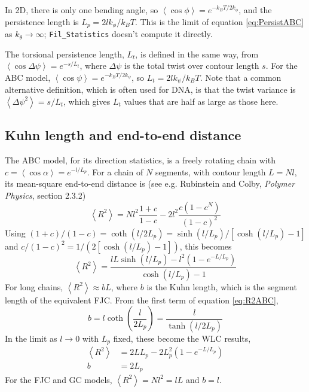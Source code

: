 \documentclass[11pt]{article}
\newcommand {\ttt} {\texttt}
\begin{document}
In 2D, there is only one bending angle, so $\left< \cos \phi \right> = e^{-k_BT/2k_\phi}$, and the persistence length is $L_p = 2 l k_\phi/k_BT$. This is the limit of equation \ref{eq:PersistABC} as $k_\theta \rightarrow \infty$; \ttt{Fil\_Statistics} doesn't compute it directly.

The torsional persistence length, $L_t$, is defined in the same way, from $\left< \cos \Delta \psi \right> = e^{-s/L_t}$, where $\Delta \psi$ is the total twist over contour length $s$. For the ABC model, $\left< \cos \psi \right> = e^{-k_BT/2k_\psi}$, so $L_t = 2 l k_\psi/k_BT$. Note that a common alternative definition, which is often used for DNA, is that the twist variance is $\left< \Delta \psi^2 \right> = s/L_t$, which gives $L_t$ values that are half as large as those here.

\subsection{Kuhn length and end-to-end distance}

The ABC model, for its direction statistics, is a freely rotating chain with $c = \left<\cos \alpha \right> = e^{-l/L_p}$. For a chain of $N$ segments, with contour length $L=Nl$, its mean-square end-to-end distance is (see e.g. Rubinstein and Colby, \textit{Polymer Physics}, section 2.3.2)
\begin{equation}
\left< R^2 \right> = N l^2 \frac{1+c}{1-c} - 2l^2 \frac{c(1-c^N)}{(1-c)^2}
\end{equation}
Using $(1+c)/(1-c) = \coth(l/2L_p) = \sinh(l/L_p)/[\cosh(l/L_p)-1]$ and $c/(1-c)^2 = 1/(2[\cosh(l/L_p)-1])$, this becomes
\begin{equation}
\left< R^2 \right> = \frac{l L \sinh(l/L_p) - l^2 \left(1-e^{-L/L_p}\right)}{\cosh(l/L_p)-1}
\label{eq:R2ABC}
\end{equation}
For long chains, $\left< R^2 \right> \approx bL$, where $b$ is the Kuhn length, which is the segment length of the equivalent FJC. From the first term of equation \ref{eq:R2ABC},
\begin{equation}
b = l \coth \left( \frac{l}{2L_p} \right) = \frac{l}{\tanh(l/2L_p)}
\end{equation}
In the limit as $l \rightarrow 0$ with $L_p$ fixed, these become the WLC results,
\begin{align}
\left< R^2 \right> &= 2 L L_p - 2L_p^2 \left(1-e^{-L/L_p}\right) \\
b &= 2L_p
\end{align}
For the FJC and GC models, $\left< R^2 \right> = N l^2 = lL$ and $b=l$.
\end{document}
